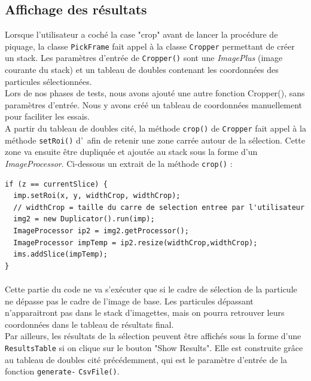 \subsection{Affichage des résultats}

Lorsque l'utilisateur a coché la case "crop" avant de lancer la procédure de piquage, la classe \texttt{PickFrame} fait appel à la classe \texttt{Cropper} permettant de créer un stack. Les paramètres d'entrée de \texttt{Cropper()} sont une \emph{ImagePlus} (image courante du stack) et un tableau de doubles contenant les coordonnées des particules sélectionnées. \\
Lors de nos phases de tests, nous avons ajouté une autre fonction Cropper(), sans paramètres d'entrée. Nous y avons créé un tableau de coordonnées manuellement pour faciliter les essais. \\
A partir du tableau de doubles cité, la méthode \texttt{crop()} de \texttt{Cropper} fait appel à la méthode \texttt{setRoi()} d'\imj ~afin de retenir une zone carrée autour de la sélection. Cette zone va ensuite être dupliquée et ajoutée au stack sous la forme d'un \emph{ImageProcessor}. Ci-dessous un extrait de la méthode \texttt{crop()} : 

\begin{center}
\begin{fmpage}{16cm}
\begin{small}
\begin{lstlisting}
if (z == currentSlice) {
  imp.setRoi(x, y, widthCrop, widthCrop);  
  // widthCrop = taille du carre de selection entree par l'utilisateur
  img2 = new Duplicator().run(imp);
  ImageProcessor ip2 = img2.getProcessor();
  ImageProcessor impTemp = ip2.resize(widthCrop,widthCrop);
  ims.addSlice(impTemp);
}
\end{lstlisting}
\end{small}	
\end{fmpage}
\end{center}

\paragraph*{}
Cette partie du code ne va s'exécuter que si le cadre de sélection de la particule ne dépasse pas le cadre de l'image de base. Les particules dépassant n'apparaitront pas dans le stack d'imagettes, mais on pourra retrouver leurs coordonnées dans le tableau de résultats final. \\

Par ailleurs, les résultats de la sélection peuvent être affichés sous la forme d'une \texttt{ResultsTable} si on clique sur le bouton "Show Results". Elle est construite grâce au tableau de doubles cité précédemment, qui est le paramètre d'entrée de la fonction \texttt{generate-} \texttt{CsvFile()}. 

